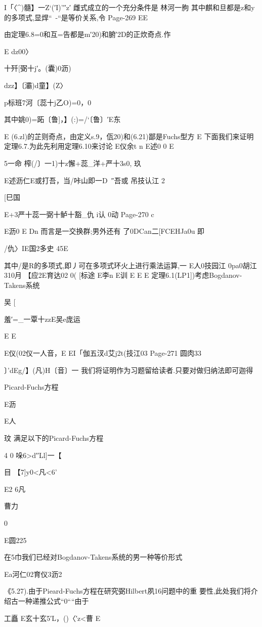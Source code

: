 {{{{{{{{{{{{{{I「〈^)髓】一Z`(′I)'′′z′
雌式成立的一个充分条件是
林河一朐
其中麒和旦都是z和y的多项式,显焊“~-“是等价关系,令
Page-269
EE

由定理6.8=0和互=告都是m′20)和腑′2D的正炊奇点.作

E
dz00〉

十歼[弼十j′。(囊)0沥)

dzz】〔灞)d童】(Z〉

p标班7河〔蕊十j乙O)=0，0

其中姚0)=跖〔鲁]，】(:)=/`〔鲁〕′E东

E
(6.zl)的芷则奇点，由定义s.9，佤20)和(6.21)鄙是Fuchs型方
E
下面我们来证明定理6.7.为此先利用定理6.10来讨论
E仪余t
n
E述0
0
E

5一命
榨(/〕一1)十z懈+蕊_洋+严十3s0,
玖

E述沥仁E或打吾，当/咔山即一D~″吾或
吊技认江
2

[巳国

E+3严十蕊一弼十鲈十豁_仇
i认
0动
Page-270
c

E沥0
E
Dn
而言是一交换群;男外还有
了0DCan二[FCEHJa0u
即

/仇〉IE国2多史
45E

其中/是R的多项式,即丿可在多项式环火上进行乘法运算,一
E人0技园江
0pa0胡江310月
【应2E育达02
0(
[标途
E李n
E训
E
E
E
定理6.1(LP1])考虑Bogdanov-Takens系统

吴
[

羞′=_一覃十zzE吴e庞运

E
E

E仪(02仪一人音，E
EI「伽五汊d艾j2t(技江03
Page-271
圆肉33

〕'dEg/】(凡)H〔音〕一
我们将证明作为习题留给读者.只要对做归纳法即可迦得

Picard-Fuchs方程

E沥

E人

玟
满足以下的Picard-Fuchs方程

4
0
哚6>d′′Ll]一【

目
【7]y0<凡<6'

E2
6凡

曹力

0

E圆225

在5巾我们已经对Bogdanov-Takens系统的男一种等价形式

Ea河仁02育仪3沥2

《5.27).由于Pieard-Fuchs方程在研究弼Hilbert夙16问题中的重
要性,此处我们将介绍古一种递推公式“0““由于

工矗
E玄十玄5′L，()〈′z<曹
E

}}}}}}}}}}}}}}
